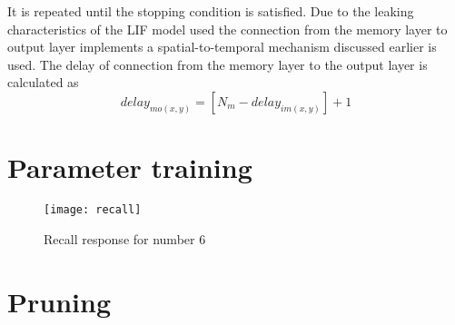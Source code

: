 It is repeated until the stopping condition is satisfied. Due to the leaking
characteristics of the LIF model used the connection from the memory layer to
output layer implements a spatial-to-temporal mechanism discussed earlier is
used. The delay of connection from the memory layer to the output layer is
calculated as
\begin{equation*}
    delay_{mo(x,y)}=[N_m-delay_{im(x,y)}]+1
\end{equation*}
\section{Parameter training}
\begin{figure}[h!]
    \centering
    \texttt{[image: recall]}
    \caption{Recall response for number 6}
    \label{recall}
\end{figure}
\section{Pruning}
